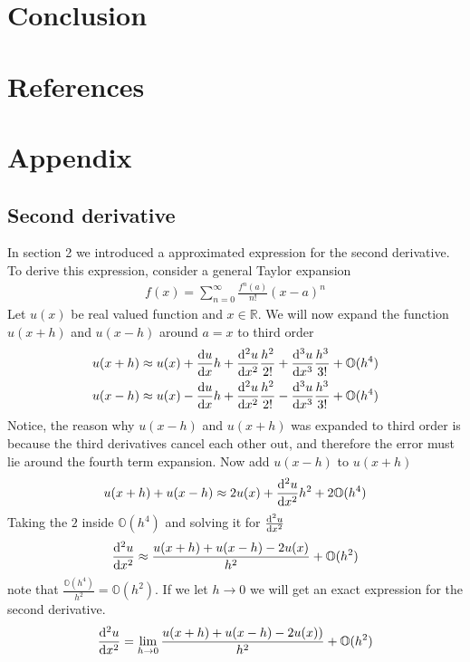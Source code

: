 \documentclass[a4paper,11pt, english, twoside]{article}
\begin{document}
\section{Conclusion}

\section{References}

\section{Appendix}
\subsection{Second derivative}
In section 2 we introduced a approximated expression for the second derivative. To derive this expression, consider a general Taylor expansion
\begin{align*}
f(x) = \sum_{n = 0}^{\infty}\frac{f^{n}(a)}{n!}(x-a)^{n}
\end{align*}
Let $u(x)$ be real valued function and $x\in \mathbb{R}$. We will now expand the function $u(x+h)$ and $u(x-h)$ around $a = x$
to third order
\begin{align*}
u(x+h) \approx u(x)  + \dv{u}{x}h + \dv[2]{u}{x}\frac{h^2}{2!} + \dv[3]{u}{x}\frac{h^3}{3!} + \mathbb{O}(h^4)
\\
u(x-h) \approx u(x) - \dv{u}{x}h + \dv[2]{u}{x}\frac{h^2}{2!} - \dv[3]{u}{x}\frac{h^3}{3!} + \mathbb{O}(h^4)
\end{align*}
Notice, the reason why $u(x-h)$ and $u(x+h)$ was expanded to third order is because the third derivatives cancel each other out, and therefore the error must lie around the fourth term expansion. Now add $u(x-h)$ to $u(x+h)$
\begin{align*}
u(x+h) + u(x-h) \approx 2u(x) + \dv[2]{u}{x}h^2 + 2\mathbb{O}(h^4)
\end{align*}
Taking the $2$ inside $\mathbb{O}(h^4)$ and solving it for $\dv[2]{u}{x}$
\begin{align*}
\dv[2]{u}{x} \approx \frac{u(x+h) + u(x-h) - 2u(x)}{h^2} + \mathbb{O}(h^2)
\end{align*}
note that $\frac{\mathbb{O}(h^4)}{h^2} = \mathbb{O}(h^2)$. If we let \(h \to 0\)
we will get an exact expression for the second derivative.
\begin{align*}
  \dv[2]{u}{x} = \lim_{h \to 0} \frac{u(x+h) + u(x-h) - 2u(x))}{h^{2}} + \mathbb{O}(h^{2})
\end{align*}
\end{document}
